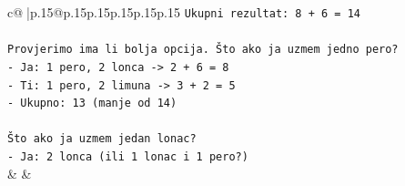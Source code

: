 \documentclass{article}
\begin{document}
{\begin{supertabular}{c@{$\;$}|p{.15\linewidth}@{}p{.15\linewidth}p{.15\linewidth}p{.15\linewidth}p{.15\linewidth}p{.15\linewidth}}
{{{\texttt{Ukupni rezultat: 8 + 6 = 14} \\
\\ 
\texttt{Provjerimo ima li bolja opcija. Što ako ja uzmem jedno pero?} \\
\texttt{{-} Ja: 1 pero, 2 lonca {-}> 2 + 6 = 8} \\
\texttt{{-} Ti: 1 pero, 2 limuna {-}> 3 + 2 = 5} \\
\texttt{{-} Ukupno: 13 (manje od 14)} \\
\\ 
\texttt{Što ako ja uzmem jedan lonac?} \\
\texttt{{-} Ja: 2 lonca (ili 1 lonac i 1 pero?)} \\
            }
        }
    }
    & & \\ \\


\end{supertabular}}
\end{document}
